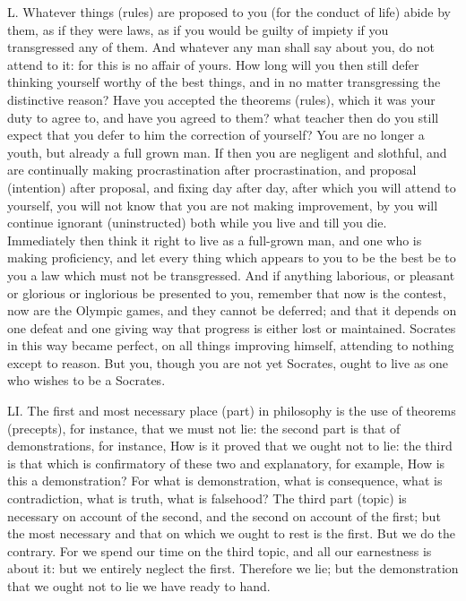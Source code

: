 L. Whatever things (rules) are proposed to you (for the conduct of life) abide by them, as if they were laws, as if you would be guilty of impiety if you transgressed any of them. And whatever any man shall say about you, do not attend to it: for this is no affair of yours. How long will you then still defer thinking yourself worthy of the best things, and in no matter transgressing the distinctive reason? Have you accepted the theorems (rules), which it was your duty to agree to, and have you agreed to them? what teacher then do you still expect that you defer to him the correction of yourself? You are no longer a youth, but already a full grown man. If then you are negligent and slothful, and are continually making procrastination after procrastination, and proposal (intention) after proposal, and fixing day after day, after which you will attend to yourself, you will not know that you are not making improvement, by you will continue ignorant (uninstructed) both while you live and till you die. Immediately then think it right to live as a full-grown man, and one who is making proficiency, and let every thing which appears to you to be the best be to you a law which must not be transgressed. And if anything laborious, or pleasant or glorious or inglorious be presented to you, remember that now is the contest, now are the Olympic games, and they cannot be deferred; and that it depends on one defeat and one giving way that progress is either lost or maintained. Socrates in this way became perfect, on all things improving himself, attending to nothing except to reason. But you, though you are not yet Socrates, ought to live as one who wishes to be a Socrates.



LI. The first and most necessary place (part) in philosophy is the use of theorems (precepts), for instance, that we must not lie: the second part is that of demonstrations, for instance, How is it proved that we ought not to lie: the third is that which is confirmatory of these two and explanatory, for example, How is this a demonstration? For what is demonstration, what is consequence, what is contradiction, what is truth, what is falsehood? The third part (topic) is necessary on account of the second, and the second on account of the first; but the most necessary and that on which we ought to rest is the first. But we do the contrary. For we spend our time on the third topic, and all our earnestness is about it: but we entirely neglect the first. Therefore we lie; but the demonstration that we ought not to lie we have ready to hand.



